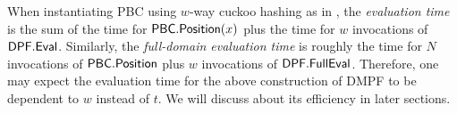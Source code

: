 When instantiating PBC using $w$-way cuckoo hashing as in , the \emph{evaluation time} is the sum of the time for ${\sf PBC}.{\sf Position}(x)$ plus the time for $w$ invocations of ${\sf DPF}.{\sf Eval}$. Similarly, the \emph{full-domain evaluation time} is roughly the time for $N$ invocations of ${\sf PBC}.{\sf Position}$ plus $w$ invocations of ${\sf DPF}.{\sf FullEval}$. Therefore, one may expect the evaluation time for the above construction of DMPF to be dependent to $w$ instead of $t$. We will discuss about its efficiency in later sections. 


